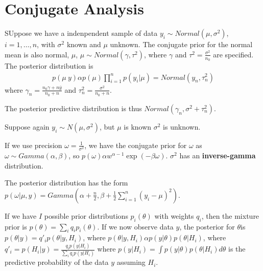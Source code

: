 \section{Conjugate Analysis}
\label{sec:conjugate-analysis}

\begin{thm}
  \label{sec:conjugate-analysis-1}
  SUppose we have a indenpendent sample of data $y_{i} \sim
  Normal(\mu, \sigma^{2})$, $i = 1, \dots, n$, with $\sigma^{2}$ known
  and $\mu$ unknown.  The conjugate prior for the normal mean is also
  normal, $\mu$, $\mu \sim Normal(\gamma, \tau^{2})$, where $\gamma$
  and $\tau^{2} = \frac{\sigma^{2}}{n_{0}} $ are specified.  The posterior distribution is
  \begin{align}
    \label{eq:11}
    p(\mu \ y) \alpha p(\mu) \prod_{i=1}^{n} p(y_{i} | \mu) =
    Normal(y_{n}, \tau^{2}_{n})
  \end{align} where $\gamma_{n} = \frac{n_{0} \gamma + n \overline
    y}{n_{0} + n}$ and $\tau^{2}_{n} = \frac{\sigma^{2}}{n_{0} + n}$.

  The posterior predictive distribution is thus $Normal(\gamma_{n},
  \sigma^{2} + \tau_{n}^{2})$.
\end{thm}

\begin{thm}
  \label{sec:conjugate-analysis-2}
  Suppose again $y_{i} \sim N(\mu, \sigma^{2})$, but $\mu$ is known
  $\sigma^{2}$ is unknown.

  If we use precision $\omega = \frac{1}{\sigma^{2}}$, we have the
  conjugate prior for $\omega$ as $\omega \sim Gamma(\alpha, \beta)$,
  so $p(\omega) \alpha w^{\alpha-1} \exp(-\beta \omega)$.
  $\sigma^{2}$ has an \textbf{inverse-gamma} distribution.

  The posterior distribution has the form $p(\omega | \mu, y) =
  Gamma(\alpha + \frac{n}{2}, \beta + \frac{1}{2} \sum_{i=1}^{n}
  (y_{i} - \mu)^{2})$.
\end{thm}

\begin{thm}
  \label{sec:conjugate-analysis-3}
  If we have $I$ possible prior distributions $p_{i}(\theta)$ with
  weights $q_{i}$, then the mixture prior is $p(\theta) = \sum_{i}^{}
  q_{i} p_{i}(\theta)$.  If we now observe data $y$, the posterior for
  $\theta$is $p(\theta | y) = q'_{i}p(\theta | y, H_{i})$, where
  $p(\theta | y, H_{i}) \alpha p(y | \theta) p(\theta | H_{i})$, where
  $q'_{i} = p(H_{i} | y) = \frac{q_{i} p(y | H_{i})}{\sum_{i} q_{i} p
    (y|H_{i})}$ where $p(y | H_{i}) = \int p(y | \theta) p(\theta |
  H_{i}) d\theta$ is the predictive probability of the data $y$
  assuming $H_{i}$.
\end{thm}

